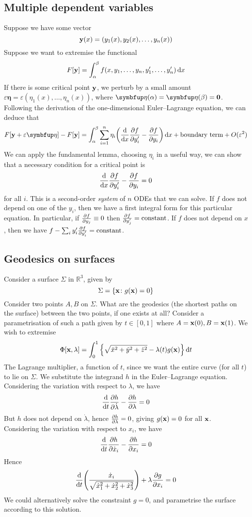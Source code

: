 \subsection{Multiple dependent variables}
Suppose we have some vector
\[
	\vb y(x) = (y_1(x), y_2(x), \dots, y_n(x))
\]
Suppose we want to extremise the functional
\[
	F[\vb y] = \int_\alpha^\beta f(x, y_1, \dots, y_n, y'_1, \dots, y'_n) \dd{x}
\]
If there is some critical point \( \vb y \), we perturb by a small amount \( \varepsilon\bm \eta = \varepsilon(\eta_1(x), \dots, \eta_n(x)) \), where \( \bm\eta(\alpha) = \bm\eta(\beta) = \vb 0 \).
Following the derivation of the one-dimensional Euler--Lagrange equation, we can deduce that
\[
	F[\vb y + \varepsilon \bm \eta] - F[\vb y] = \int_\alpha^\beta \sum_{i=1}^n \eta_i \qty(\dv{x}\pdv{f}{y_i'} - \pdv{f}{y_i})\dd{x} + \text{boundary term} + O(\varepsilon^2)
\]
We can apply the fundamental lemma, choosing \( \eta_i \) in a useful way, we can show that a necessary condition for a critical point is
\[
	\dv{x}\pdv{f}{y_i'} - \pdv{f}{y_i} = 0
\]
for all \( i \).
This is a second-order \textit{system} of \( n \) ODEs that we can solve.
If \( f \) does not depend on one of the \( y_i \), then we have a first integral form for this particular equation.
In particular, if \( \pdv{f}{y_j} \equiv 0 \) then \( \pdv{f}{y_j'} = \text{constant} \).
If \( f \) does not depend on \( x \), then we have \( f - \sum_i y_i' \pdv{f}{y_i'} = \text{constant} \).

\subsection{Geodesics on surfaces}
Consider a surface \( \Sigma \) in \( \mathbb R^3 \), given by
\[
	\Sigma = \qty{ \vb x \colon g(\vb x) = 0 }
\]
Consider two points \( A, B \) on \( \Sigma \).
What are the geodesics (the shortest paths on the surface) between the two points, if one exists at all?
Consider a parametrisation of such a path given by \( t \in [0, 1] \) where \( A = \vb x(0), B = \vb x(1) \).
We wish to extremise
\[
	\Phi[\vb x, \lambda] = \int_0^1 \qty{ \sqrt{\dot x^2 + \dot y^2 + \dot z^2} - \lambda(t) g(\vb x) } \dd{t}
\]
The Lagrange multiplier, a function of \( t \), since we want the entire curve (for all \( t \)) to lie on \( \Sigma \).
We substitute the integrand \( h \) in the Euler--Lagrange equation.
Considering the variation with respect to \( \lambda \), we have
\[
	\dv{t} \pdv{h}{\dot\lambda} - \pdv{h}{\lambda} = 0
\]
But \( h \) does not depend on \( \dot\lambda \), hence \( \pdv{h}{\lambda} = 0 \), giving \( g(\vb x) = 0 \) for all \( \vb x \).
Considering the variation with respect to \( x_i \), we have
\[
	\dv{t} \pdv{h}{\dot x_i} - \pdv{h}{x_i} = 0
\]
Hence
\[
	\dv{t}\qty(\frac{\dot x_i}{\sqrt{\dot x_1^2 + \dot x_2^2 + \dot x_3^2}}) + \lambda \pdv{g}{x_i} = 0
\]
We could alternatively solve the constraint \( g = 0 \), and parametrise the surface according to this solution.

